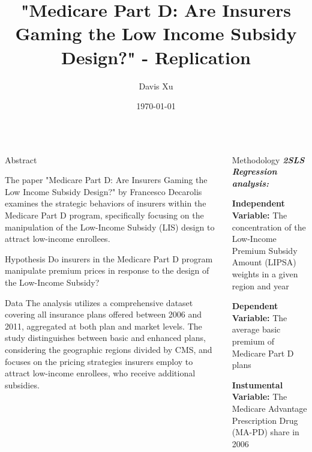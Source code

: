 \documentclass[final]{beamer}
\title{\Huge "Medicare Part D: Are Insurers Gaming the Low Income Subsidy Design?" - Replication} %
\author{\Large Davis Xu} %
\institute{\Large Texas A\&M University} %
\date{\Large\today} %
\begin{document}
\begin{frame}[t]

\begin{block}{}
\centering
\maketitle
\end{block}

\begin{columns}[T] %

\begin{column}{.32\textwidth}
    \begin{block}{\Huge Abstract} %


    \Large %
    The paper "Medicare Part D: Are Insurers Gaming the Low Income Subsidy Design?" by Francesco Decarolis examines the strategic behaviors of insurers within the Medicare Part D program, specifically focusing on the manipulation of the Low-Income Subsidy (LIS) design to attract low-income enrollees.
    \end{block}

    \vspace{1cm} %

    \begin{block}{\Huge Hypothesis} %
    \Large %
    Do insurers in the Medicare Part D program manipulate premium prices in response to the design of the Low-Income Subsidy?
    \end{block}

    \vspace{1cm} %

    \begin{block}{\Huge Data} %
    \Large %
    The analysis utilizes a comprehensive dataset covering all insurance plans offered between 2006 and 2011, aggregated at both plan and market levels. The study distinguishes between basic and enhanced plans, considering the geographic regions divided by CMS, and focuses on the pricing strategies insurers employ to attract low-income enrollees, who receive additional subsidies.
    \end{block}
\end{column}

\begin{column}{.32\textwidth}
    \begin{block}{\Huge Methodology} %
    \Large %
    \textit{\textbf{2SLS Regression analysis:}} \par
        \textbf{Independent Variable:} The concentration of the Low-Income Premium Subsidy Amount (LIPSA) weights in a given region and year \par
        \textbf{Dependent Variable:} The average basic premium of Medicare Part D plans \par
        \textbf{Instumental Variable:} The Medicare Advantage Prescription Drug (MA-PD) share in 2006 
        

\end{block}
\end{column}
\end{columns}
\end{frame}
\end{document}

